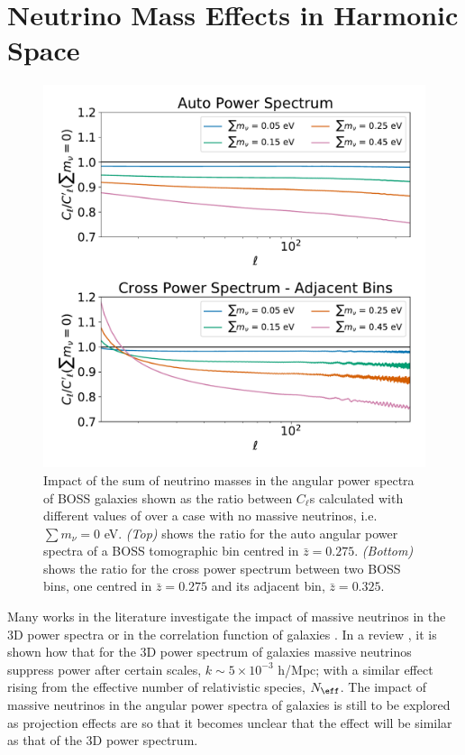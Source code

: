 \section{Neutrino Mass Effects in Harmonic Space}
\begin{figure}
\begin{center}
\includegraphics[scale=0.50]{Neutrino-FIGS/Neutrinos_SumMnu.pdf}
\caption[Impact of the sum of neutrino masses in the angular power spectra of galaxies.]{Impact of the sum of neutrino masses in the angular power spectra of BOSS galaxies shown as the ratio between $C_{\ell}$s calculated with different values of \NM{} over a case with no massive neutrinos, i.e. $\sum m_{\nu} = 0$ eV. \textit{(Top)} shows the ratio for the auto angular power spectra of a BOSS tomographic bin centred in $\bar{z} = 0.275$. \textit{(Bottom)} shows the ratio for the cross power spectrum between two BOSS bins, one centred in $\bar{z} = 0.275$ and its adjacent bin, $\bar{z} = 0.325$.}
\label{fig:neutrinoCompareSumM}
\end{center}
\end{figure}
Many works in the literature investigate the impact of massive neutrinos in the 3D power spectra or in the correlation function of galaxies \citep{2007FBA,2012Julien-Deg,Bird2012}. In a review \cite{2006NeutrinoReview}, it is shown how that for the 3D power spectrum of galaxies massive neutrinos suppress power after certain scales, $k \sim 5\times 10^{-3}$ h/Mpc; with a similar effect rising from the effective number of relativistic species, $N_{\text{\eff}}$. The impact of massive neutrinos in the angular power spectra of galaxies is still to be explored as projection effects are so that it becomes unclear that the effect will be similar as that of the 3D power spectrum.

